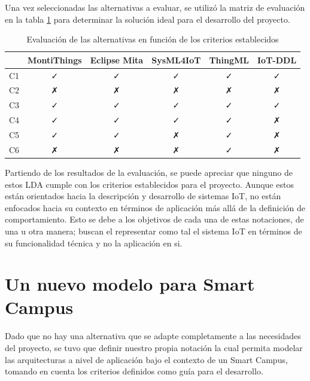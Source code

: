 Una vez seleccionadas las alternativas a evaluar, se utilizó la matriz de evaluación en la tabla \ref{tab:evaluation} para determinar la solución ideal para el desarrollo del proyecto. 

\skipline
\skipline
\skipline
\skipline

\begin{table}[H]
    \centering
    \vspace{-4mm}
    \caption{Evaluación de las alternativas en función de los criterios establecidos} \label{tab:evaluation}
    \vspace{4mm}
    \begin{tabular}{cccccc}
    \hline
    \multicolumn{1}{l}{} &
      \multicolumn{1}{l}{MontiThings} &
      \multicolumn{1}{l}{Eclipse Mita} &
      \multicolumn{1}{l}{SysML4IoT} &
      \multicolumn{1}{l}{ThingML} &
      \multicolumn{1}{l}{IoT-DDL} \\ \hline
      C1 & ✓ & ✓ & ✓ & ✓ & ✓ \\
      C2 & ✗ & ✗ & ✗ & ✗ & ✗ \\
      C3 & ✓ & ✓ & ✓ & ✓ & ✓ \\
      C4 & ✓ & ✓ & ✓ & ✓ & ✗ \\
      C5 & ✓ & ✓ & ✗ & ✓ & ✗ \\
      C6 & ✗ & ✗ & ✗ & ✓ & ✗ \\ \hline
    \end{tabular}
    \vspace{-4mm}
\end{table}

Partiendo de los resultados de la evaluación, se puede apreciar que ninguno de estos LDA cumple con los criterios establecidos para el proyecto. Aunque estos están orientados hacia la descripción y desarrollo de sistemas IoT, no están enfocados hacia su contexto en términos de aplicación más allá de la definición de comportamiento. Esto se debe a los objetivos de cada una de estas notaciones, de una u otra manera; buscan el representar como tal el sistema IoT en términos de su funcionalidad técnica y no la aplicación en si. 

\section{Un nuevo modelo para Smart Campus}

Dado que no hay una alternativa que se adapte completamente a las necesidades del proyecto, se tuvo que definir nuestro propia notación la cual permita modelar las arquitecturas a nivel de aplicación bajo el contexto de un Smart Campus, tomando en cuenta los criterios definidos como guía para el desarrollo.

